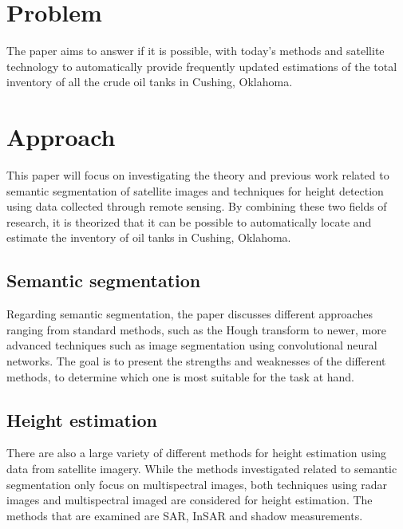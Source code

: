 \section{Problem}

The paper aims to answer if it is possible, with today's methods and satellite technology to automatically provide frequently updated estimations of the total inventory of all the crude oil tanks in Cushing, Oklahoma.

\section{Approach}

This paper will focus on investigating the theory and previous work related to semantic segmentation of satellite images and techniques for height detection using data collected through remote sensing. By combining these two fields of research, it is theorized that it can be possible to automatically locate and estimate the inventory of oil tanks in Cushing, Oklahoma.

\subsection*{Semantic segmentation}
Regarding semantic segmentation, the paper discusses different approaches ranging from standard methods, such as the Hough transform to newer, more advanced techniques such as image segmentation using convolutional neural networks. The goal is to present the strengths and weaknesses of the different methods, to determine which one is most suitable for the task at hand.

\subsection*{Height estimation}
There are also a large variety of different methods for height estimation using data from satellite imagery. While the methods investigated related to semantic segmentation only focus on multispectral images, both techniques using radar images and multispectral imaged are considered for height estimation. The methods that are examined are SAR, InSAR and shadow measurements.

